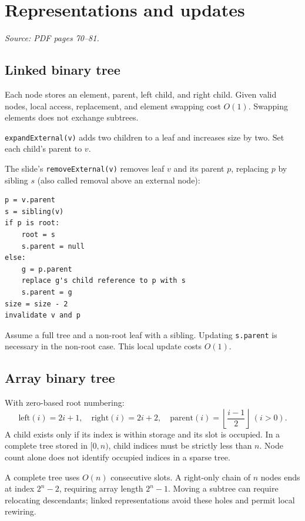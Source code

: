 \documentclass[11pt,letterpaper]{article}
\newcommand{\sourcepages}[1]{\textit{Source: PDF pages #1.}}
\newcommand{\method}[1]{\texttt{#1}}
\begin{document}
\section{Representations and updates}
\sourcepages{70--81}
\subsection{Linked binary tree}
Each node stores an element, parent, left child, and right child. Given valid nodes, local access, replacement, and element swapping cost $O(1)$. Swapping elements does not exchange subtrees.

\method{expandExternal(v)} adds two children to a leaf and increases size by two. Set each child's parent to $v$.

The slide's \method{removeExternal(v)} removes leaf $v$ and its parent $p$, replacing $p$ by sibling $s$ (also called removal above an external node):
\par\noindent\begin{minipage}{\linewidth}
\begin{lstlisting}
p = v.parent
s = sibling(v)
if p is root:
    root = s
    s.parent = null
else:
    g = p.parent
    replace g's child reference to p with s
    s.parent = g
size = size - 2
invalidate v and p
\end{lstlisting}
\end{minipage}\par
Assume a full tree and a non-root leaf with a sibling. Updating \method{s.parent} is necessary in the non-root case. This local update costs $O(1)$.

\subsection{Array binary tree}
With zero-based root numbering:
\[
\text{left}(i)=2i+1,\quad \text{right}(i)=2i+2,\quad
\text{parent}(i)=\left\lfloor\frac{i-1}{2}\right\rfloor\ (i>0).
\]
A child exists only if its index is within storage and its slot is occupied. In a complete tree stored in $[0,n)$, child indices must be strictly less than $n$. Node count alone does not identify occupied indices in a sparse tree.

A complete tree uses $O(n)$ consecutive slots. A right-only chain of $n$ nodes ends at index $2^n-2$, requiring array length $2^n-1$. Moving a subtree can require relocating descendants; linked representations avoid these holes and permit local rewiring.
\end{document}
